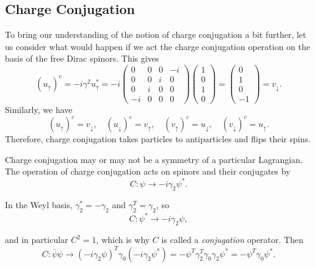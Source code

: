 \documentclass[11pt]{article}
\theoremstyle{definition}
\begin{document}
\subsection{Charge Conjugation}
To bring our understanding of the notion of charge conjugation a bit further, let us consider what would happen if we act the charge conjugation operation on the basis of the free Dirac spinors. This gives
\begin{equation}
    (u_\uparrow)^c = -i\gamma^2u_\uparrow^* = -i
    \begin{pmatrix}
        0&0&0&-i\\
        0&0&i&0\\
        0&i&0&0\\
        -i&0&0&0
    \end{pmatrix}
    \begin{pmatrix}
        1\\0\\1\\0
    \end{pmatrix} = 
    \begin{pmatrix}
        0\\1\\0\\-1
    \end{pmatrix} = v_\downarrow.
\end{equation}
Similarly, we have
\begin{equation}
    (u_\uparrow)^c = v_\downarrow, \quad
    (u_\downarrow)^c = v_\uparrow, \quad
    (v_\uparrow)^c = u_\downarrow, \quad
    (v_\downarrow)^c = u_\uparrow.
\end{equation}
Therefore, charge conjugation takes particles to antiparticles and flips their spins.

Charge conjugation may or may not be a symmetry of a particular Lagrangian. The operation of charge conjugation acts on spinors and their conjugates by  
\begin{equation}
C : \psi \rightarrow -i\gamma_2\psi^*.
\end{equation}  

In the Weyl basis, \(\gamma_2^* = -\gamma_2\) and \(\gamma_2^T = \gamma_2\), so  
\begin{equation}
C : \psi^* \rightarrow -i\gamma_2\psi,
\end{equation}  

and in particular \(C^2 = 1\), which is why \(C\) is called a \emph{conjugation} operator. Then  
\begin{equation}
C : \bar{\psi}\psi \rightarrow (-i\gamma_2\psi)^T\gamma_0(-i\gamma_2\psi^*) = -\psi^T\gamma_2^T\gamma_0\gamma_2\psi^* = -\psi^T\gamma_0\psi^*.
\end{equation}  
\end{document}
